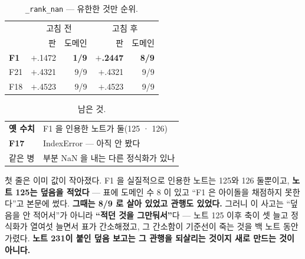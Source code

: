 \documentclass[10pt]{article}
\begin{document}
\begin{table}[t]
\centering\tsize
\caption{\texttt{\_rank\_nan} --- 유한한 것만 순위.}
\begin{tabular}{lrrrr}
\toprule
& \multicolumn{2}{c}{고침 전} & \multicolumn{2}{c}{고침 후} \\
& 판 & 도메인 & 판 & 도메인 \\
\midrule
\textbf{F1} & $+$.1472 & \textbf{1/9} & \textbf{$+$.2447} & \textbf{8/9} \\
F21 & $+$.4321 & 9/9 & $+$.4321 & 9/9 \\
F18 & $+$.4523 & 9/9 & $+$.4523 & 9/9 \\
\bottomrule
\end{tabular}
\end{table}



\begin{table}[t]
\centering\tsize
\caption{남은 것.}
\begin{tabular}{ll}
\toprule
\textbf{옛 수치} & F1 을 인용한 노트가 둘(125 · 126) \\
\textbf{F17} & IndexError --- 아직 안 봤다 \\
같은 병 & 부분 NaN 을 내는 다른 정식화가 있나 \\
\bottomrule
\end{tabular}
\end{table}

첫 줄은 이미 값이 작아졌다. F1 을 실질적으로 인용한 노트는 125와 126
둘뿐이고, \textbf{노트 125는 덮음을 적었다} --- 표에 도메인 수 8 이 있고
``F1 은 아이돌을 채점하지 못한다''고 본문에 썼다. \textbf{그때는 8/9 로
살아 있었고 관행도 있었다.} 그러니 이 사고는 ``덮음을 안 적어서''가 아니라
\textbf{``적던 것을 그만둬서''}다 --- 노트 125 이후 축이 셋 늘고 정식화가
열여섯 늘면서 표가 간소해졌고, 그 간소함이 기준선이 죽는 것을 백 노트
동안 가렸다. \textbf{노트 231이 붙인 덮음 보고는 그 관행을 되살리는 것이지
새로 만드는 것이 아니다.}
\end{document}
